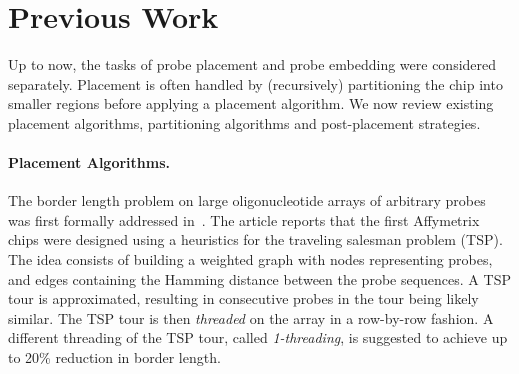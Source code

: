\documentclass{llncs}
\newcommand{\ignore}[1]{}
\begin{document}
\section{Previous Work}
\label{sec:previous_work}

Up to now, the tasks of probe placement and probe embedding
were considered separately. Placement is often handled by
(recursively) partitioning the chip into smaller regions before applying a
placement algorithm. We now review existing placement algorithms, partitioning
algorithms and post-placement strategies.

\paragraph{Placement Algorithms.}
The border length problem on large oligonucleotide arrays of arbitrary probes
was first formally addressed in~\cite{HANNENHALLI02}. The article reports that
the first Affymetrix chips were designed using a heuristics for the traveling
salesman problem (TSP). The idea consists of building a weighted graph with
nodes representing probes, and edges containing the Hamming distance between
the probe sequences. A TSP tour is approximated, resulting in consecutive
probes in the tour being likely similar. The TSP tour is then
\emph{threaded} on the array in a row-by-row fashion.
A different threading of the TSP tour, called
\emph{1-threading}, is suggested to achieve up to 20\% reduction in border length.

\ignore{ Kahng~{\it et~al}.~\cite{KAHNG02} propose the \emph{Epitaxial}
  placement algorithm that places a random probe in the center of the array
  and continues to insert probes in spots adjacent to already filled spots,
  employing a greedy heuristic to select the next spot to be filled and the
  probe that is assigned to it. Priority is given to spots whose neighbors are
  already filled, in which case the algorithm places the probe with minimum
  sum of Hamming distances to its neighbors. If no such a spot exists, the
  algorithm examines all non-filled spots~$s_i$ with $n_i \geq 1$ filled
  neighbors and finds a non-assigned probe $p_j$ with minimum sum of Hamming
  distances to the neighboring probes $H_{ij}$. For each possible assignment
  of $p_j$ to $s_i$, it computes a cost $c(s_i,p_j) := k_{n_i} H_{ij} / n$,
  where $k_{n_i}$ are scaling coefficients ($k_1 = 1$, $k_2 = 0.8$, and $k_3 =
  0.6$), and makes the assignment with minimum cost. With this algorithm, they
  claimed to achieve up to 10\% reduction in border conflicts over the
  TSP-based approach of Hannenhalli~{\it et~al}.\ \cite{HANNENHALLI02}.
%  
}
\end{document}
